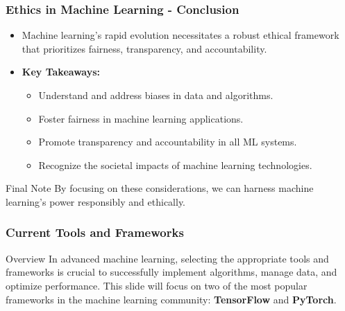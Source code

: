 \documentclass[aspectratio=169]{beamer}
\begin{document}
\begin{frame}[fragile]
    \frametitle{Ethics in Machine Learning - Conclusion}
    \begin{itemize}
        \item Machine learning's rapid evolution necessitates a robust ethical framework that prioritizes fairness, transparency, and accountability.
        \item \textbf{Key Takeaways:}
        \begin{itemize}
            \item Understand and address biases in data and algorithms.
            \item Foster fairness in machine learning applications.
            \item Promote transparency and accountability in all ML systems.
            \item Recognize the societal impacts of machine learning technologies.
        \end{itemize}
    \end{itemize}
    \begin{block}{Final Note}
        By focusing on these considerations, we can harness machine learning's power responsibly and ethically.
    \end{block}
\end{frame}

\begin{frame}
    \frametitle{Current Tools and Frameworks}
    \begin{block}{Overview}
        In advanced machine learning, selecting the appropriate tools and frameworks is crucial to successfully implement algorithms, manage data, and optimize performance. This slide will focus on two of the most popular frameworks in the machine learning community: \textbf{TensorFlow} and \textbf{PyTorch}.
    \end{block}
\end{frame}
\end{document}
